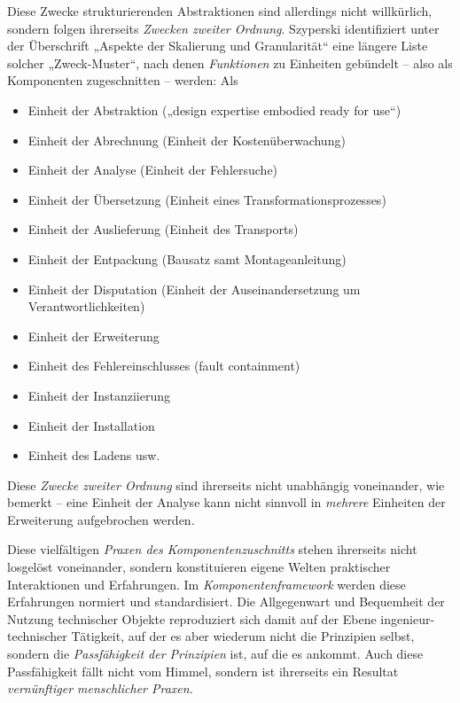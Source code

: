 \documentclass[11pt,a4paper]{article}
\begin{document}
Diese Zwecke strukturierenden Abstraktionen sind allerdings nicht willkürlich,
sondern folgen ihrerseits \emph{Zwecken zweiter Ordnung}.  Szyperski
\cite[S. 139\,ff.]{Szyperski2002} identifiziert unter der Überschrift „Aspekte
der Skalierung und Granularität“ eine längere Liste solcher „Zweck-Muster“,
nach denen \emph{Funktionen} zu Einheiten gebündelt -- also als Komponenten
zugeschnitten -- werden: Als
\begin{itemize}\itemsep0pt
\item Einheit der Abstraktion („design expertise embodied ready for use“)
\item Einheit der Abrechnung (Einheit der Kostenüberwachung)
\item Einheit der Analyse (Einheit der Fehlersuche)
\item Einheit der Übersetzung (Einheit eines Transformationsprozesses)
\item Einheit der Auslieferung (Einheit des Transports)
\item Einheit der Entpackung (Bausatz samt Montageanleitung)
\item Einheit der Disputation (Einheit der Auseinandersetzung um
  Verantwortlichkeiten) 
\item Einheit der Erweiterung 
\item Einheit des Fehlereinschlusses (fault containment)
\item Einheit der Instanziierung
\item Einheit der Installation
\item Einheit des Ladens usw.
\end{itemize}
Diese \emph{Zwecke zweiter Ordnung} sind ihrerseits nicht unabhängig
voneinander, wie \cite[S. 145]{Szyperski2002} bemerkt -- eine Einheit der
Analyse kann nicht sinnvoll in \emph{mehrere} Einheiten der Erweiterung
aufgebrochen werden.

Diese vielfältigen \emph{Praxen des Komponentenzuschnitts} stehen ihrerseits
nicht losgelöst voneinander, sondern konstituieren eigene Welten praktischer
Interaktionen und Erfahrungen. Im \emph{Komponentenframework} werden diese
Erfahrungen normiert und standardisiert.  Die Allgegenwart und Bequemheit der
Nutzung technischer Objekte reproduziert sich damit auf der Ebene
ingenieur-technischer Tätigkeit, auf der es aber wiederum nicht die Prinzipien
selbst, sondern die \emph{Passfähigkeit der Prinzipien} ist, auf die es
ankommt.  Auch diese Passfähigkeit fällt nicht vom Himmel, sondern ist
ihrerseits ein Resultat \emph{vernünftiger menschlicher Praxen}.
\end{document}
